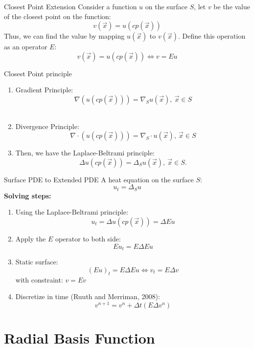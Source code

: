 \documentclass{beamer}
\begin{document}
\begin{frame}{Closest Point Extension}
    Consider a function $u$ on the surface $S$, let $v$ be the value of the closest point on the function:
    $$v(\vec{x}) = u(cp(\vec{x}))$$
    \pause
    Thus, we can find the value by mapping $u(\vec{x})$ to $v(\vec{x})$.
    \newline
    \pause
    Define this operation as an operator $E$:
    $$v(\vec{x})=u(cp(\vec{x})) \Leftrightarrow v=Eu$$
\end{frame}

\begin{frame}{Closest Point principle}
    \begin{enumerate}
   \item <1-> Gradient Principle:
   $$\nabla(u(cp(\vec{x})))=\nabla_S u(\vec{x}),\ \vec{x}\in S$$\\
   \item <2-> Divergence Principle:
   $$\nabla\cdot(u(cp(\vec{x})))=\nabla_S \cdot u(\vec{x}),\ \vec{x}\in S$$
   \item <3->
   Then, we have the Laplace-Beltrami principle:
$$ \Delta u(cp(\vec{x}))=\Delta_S u(\vec{x}),\ \vec{x}\in S.$$
   \end{enumerate}

\end{frame}

\begin{frame}{Surface PDE to Extended PDE}
    A heat equation on the surface $S$:
    $$u_t=\Delta_S u$$
    \textbf{Solving steps:}
   \begin{enumerate}
   \item Using the Laplace-Beltrami principle:
   $$u_t=\Delta u(cp(\vec{x}))=\Delta Eu$$
   \item Apply the $E$ operator to both side:
   $$Eu_t=E\Delta Eu$$
   \item Static surface:
   $$(Eu)_t=E\Delta Eu \Leftrightarrow v_t = E\Delta v$$
   with constraint: $v = Ev$
   \item Discretize in time (Ruuth and Merriman, 2008):
   $$v^{n+1}=v^n+\Delta t(E\Delta v^n)$$
   \end{enumerate}
\end{frame}

\section{Radial Basis Function}
\end{document}
